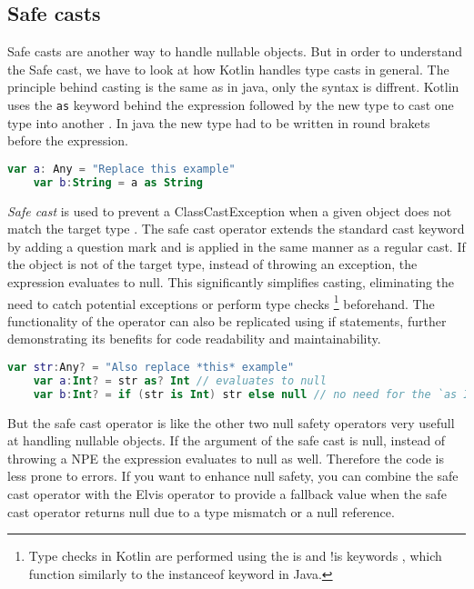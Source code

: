 \documentclass[a4paper, 11pt]{article}
\begin{document}
\subsection{Safe casts}
  Safe casts are another way to handle nullable objects. But in order to understand the Safe cast, we have to look at how Kotlin handles type casts in general. The principle behind casting is the same as in java, only the syntax is diffrent. Kotlin uses the \texttt{as} keyword behind the expression followed by the new type to cast one type into another \cite{casting}. In java the new type had to be written in round brakets before the expression.
  \begin{lstlisting}[language=Kotlin,title={Casting in Kotlin}]
    var a: Any = "Replace this example"
    var b:String = a as String
  \end{lstlisting} %
  \textit{Safe cast} is used to prevent a ClassCastException when a given object does not match the target type \cite{nullsafety-safe-cast}. The safe cast operator extends the standard cast keyword by adding a question mark and is applied in the same manner as a regular cast. If the object is not of the target type, instead of throwing an exception, the expression evaluates to null. This significantly simplifies casting, eliminating the need to catch potential exceptions or perform type checks \footnote{Type checks in Kotlin are performed using the is and !is keywords \cite{casting-is-operator}, which function similarly to the instanceof keyword in Java.} beforehand. The functionality of the operator can also be replicated using if statements, further demonstrating its benefits for code readability and maintainability.
  \begin{lstlisting}[language=Kotlin,title={Usage of the safe cast operator in comparisopn to an if statement}]
    var str:Any? = "Also replace *this* example"
    var a:Int? = str as? Int // evaluates to null
    var b:Int? = if (str is Int) str else null // no need for the `as Int` here due to smart casting
  \end{lstlisting}
  But the safe cast operator is like the other two null safety operators very usefull at handling nullable objects. If the argument of the safe cast is null, instead of throwing a NPE the expression evaluates to null as well. Therefore the code is less prone to errors. If you want to enhance null safety, you can combine the safe cast operator with the Elvis operator to provide a fallback value when the safe cast operator returns null due to a type mismatch or a null reference.
\end{document}
